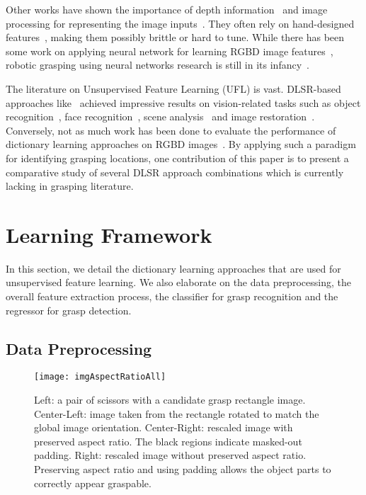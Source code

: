 \documentclass[svgnames]{scrartcl}
\begin{document}
Other works have shown the importance of depth information~\citep{lai2011large, blum2012learned} and image processing for representing the image inputs~\citep{maitin2010cloth, saxena2008robotic}. They often rely on hand-designed features~\citep{rusu2010fast}, making them possibly brittle or hard to tune. While there has been some work on applying neural network for learning RGBD image features~\citep{socher2012convolutional, gupta2014learning}, robotic grasping using neural networks research is still in its infancy~\citep{lenz2015deep, redmonRealtimeCnnGrasp}.

The literature on Unsupervised Feature Learning (UFL) is vast. DLSR-based approaches like~\citep{aharon2006img, mairal2009online, yang2009linear} achieved impressive results on vision-related tasks such as object recognition~\citep{bo2013unsupervised}, face recognition~\citep{zhang2010discriminative}, scene analysis~\citep{lazebnik2006beyond} and image restoration~\citep{elad2006image}. Conversely, not as much work has been done to evaluate the performance of dictionary learning approaches on RGBD images~\citep{bo2013unsupervised}. By applying such a paradigm for identifying grasping locations, one contribution of this paper is to present a comparative study of several DLSR approach combinations which is currently lacking in grasping literature.


\section{Learning Framework}
\label{sec:learning_framework}

In this section, we detail the dictionary learning approaches that are used for unsupervised feature learning. We also elaborate on the data preprocessing, the overall feature extraction process, the classifier for grasp recognition and the regressor for grasp detection.

\subsection{Data Preprocessing}

\begin{figure}[t]
\centering
\texttt{[image: imgAspectRatioAll]}
\caption{Left: a pair of scissors with a candidate grasp rectangle image. Center-Left: image taken from the rectangle rotated to match the global image orientation. Center-Right: rescaled image with preserved aspect ratio. The black regions indicate masked-out padding. Right: rescaled image without preserved aspect ratio. Preserving aspect ratio and using padding allows the object parts to correctly appear graspable.}
\label{fig:imgAspectRatioAll}
\end{figure}
\end{document}
